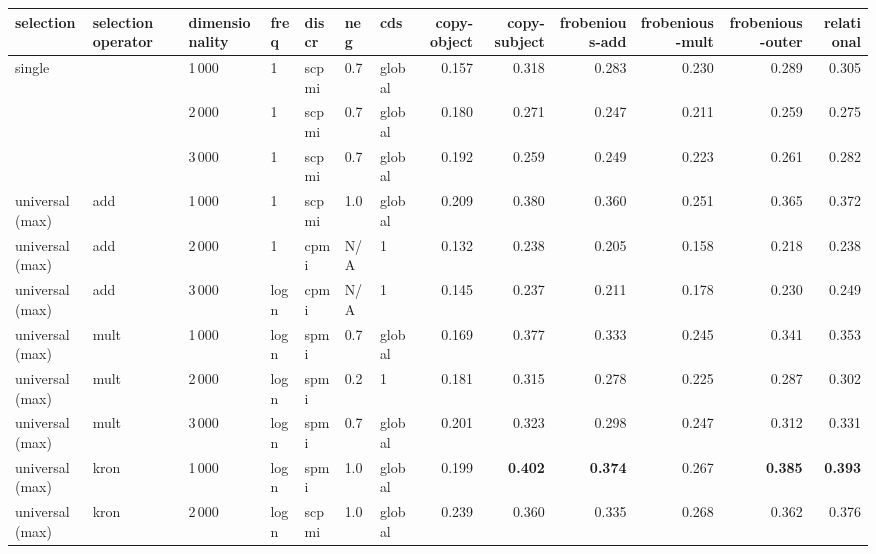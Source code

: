 \begin{tabular}{lllllllrrrrrr}
\toprule
selection & selection operator & dimensionality & freq & discr & neg & cds & copy-object &  copy-subject &  frobenious-add &  frobenious-mult &  frobenious-outer &  relational \\
\midrule
single                 & {}   & 1\,000 & 1    & scpmi  & 0.7 & global &        0.157 &         0.318 &           0.283 &            0.230 &             0.289 &       0.305 \\
                       & {}   & 2\,000 & 1    & scpmi  & 0.7 & global &        0.180 &         0.271 &           0.247 &            0.211 &             0.259 &       0.275 \\
                       & {}   & 3\,000 & 1    & scpmi  & 0.7 & global &        0.192 &         0.259 &           0.249 &            0.223 &             0.261 &       0.282 \\
\addlinespace
universal (max)        & add  & 1\,000 & 1    & scpmi  & 1.0 & global &        0.209 &         0.380 &           0.360 &            0.251 &             0.365 &       0.372 \\
universal (max)        & add  & 2\,000 & 1    & cpmi   & N/A & 1      &        0.132 &         0.238 &           0.205 &            0.158 &             0.218 &       0.238 \\
universal (max)        & add  & 3\,000 & logn & cpmi   & N/A & 1      &        0.145 &         0.237 &           0.211 &            0.178 &             0.230 &       0.249 \\
\addlinespace
universal (max)        & mult & 1\,000 & logn  & spmi  & 0.7 & global &        0.169 &         0.377 &           0.333 &            0.245 &             0.341 &       0.353 \\
universal (max)        & mult & 2\,000 & logn  & spmi  & 0.2 & 1      &        0.181 &         0.315 &           0.278 &            0.225 &             0.287 &       0.302 \\
universal (max)        & mult & 3\,000 & logn  & spmi  & 0.7 & global &        0.201 &         0.323 &           0.298 &            0.247 &             0.312 &       0.331 \\
\addlinespace
universal (max)        & kron & 1\,000 & logn  & spmi  & 1.0 & global &        0.199 &         \textbf{0.402} &           \textbf{0.374} &            0.267 &             \textbf{0.385} &       \textbf{0.393} \\
universal (max)        & kron & 2\,000 & logn  & scpmi & 1.0 & global &        0.239 &         0.360 &           0.335 &            0.268 &             0.362 &       0.376 \\

\end{tabular}

